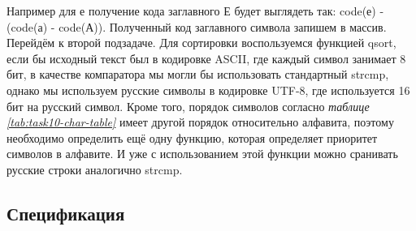 \documentclass[a4paper, 12pt, oneside]{article}
\begin{document}
    Например для е получение кода заглавного Е будет выглядеть так: code(е) - (code(а) - code(А)).
    Полученный код заглавного символа запишем в массив.
    Перейдём к второй подзадаче.
    Для сортировки воспользуемся функцией qsort, если бы исходный текст был в кодировке ASCII, где каждый символ занимает 8 бит, в качестве компаратора мы могли бы использовать стандартный strcmp,
    однако мы используем русские символы в кодировке UTF-8, где используется 16 бит на русский символ.
    Кроме того, порядок символов согласно \textit{таблице \ref{tab:task10-char-table}} имеет другой порядок относительно алфавита,
    поэтому необходимо определить ещё одну функцию, которая определяет приоритет символов в алфавите.
    И уже с использованием этой функции можно сранивать русские строки аналогично strcmp.

    \subsection{Спецификация}
\end{document}

